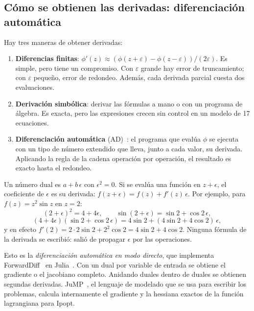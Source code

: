 \subsection{Cómo se obtienen las derivadas: diferenciación automática}
Hay tres maneras de obtener derivadas:
\begin{enumerate}
  \item \textbf{Diferencias finitas}: $\phi'(z)\approx(\phi(z+\varepsilon)-\phi(z-\varepsilon))/(2\varepsilon)$.
        Es simple, pero tiene un compromiso. Con $\varepsilon$ grande hay error de truncamiento;
        con $\varepsilon$ pequeño, error de redondeo. Además, cada derivada parcial cuesta dos
        evaluaciones.
  \item \textbf{Derivación simbólica}: derivar las fórmulas a mano o con un programa de
        álgebra. Es exacta, pero las expresiones crecen sin control en un modelo de 17
        ecuaciones.
  \item \textbf{Diferenciación automática} (AD)~\cite{griewank2008}: el programa que evalúa
        $\phi$ se ejecuta con un tipo de número extendido que lleva, junto a cada valor, su
        derivada. Aplicando la regla de la cadena operación por operación, el resultado es
        exacto hasta el redondeo.
\end{enumerate}

\begin{ejemplo}\label{ej:duales}
Un número dual es $a+b\,\epsilon$ con $\epsilon^2=0$. Si se evalúa una función en $z+\epsilon$,
el coeficiente de $\epsilon$ es su derivada: $f(z+\epsilon)=f(z)+f'(z)\,\epsilon$. Por ejemplo,
para $f(z)=z^2\sin z$ en $z=2$:
\[
(2+\epsilon)^2=4+4\epsilon,\qquad \sin(2+\epsilon)=\sin2+\cos2\,\epsilon,
\]
\[
(4+4\epsilon)(\sin2+\cos2\,\epsilon)=4\sin2+(4\sin2+4\cos2)\,\epsilon,
\]
y en efecto $f'(2)=2\cdot2\sin2+2^2\cos2=4\sin2+4\cos2$. Ninguna fórmula de la derivada se
escribió: salió de propagar $\epsilon$ por las operaciones.
\end{ejemplo}
\noindent Esto es la \emph{diferenciación automática en modo directo}, que implementa
ForwardDiff~\cite{revels2016} en Julia~\cite{bezanson2017}. Con un dual por variable de entrada
se obtiene el gradiente o el jacobiano completo. Anidando duales dentro de duales se obtienen
segundas derivadas. JuMP~\cite{dunning2017}, el lenguaje de modelado que se usa para escribir los
problemas, calcula internamente el gradiente y la hessiana exactos de la función lagrangiana
para Ipopt.

